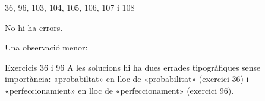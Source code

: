 
%
        {36, 96, 103, 104, 105, 106, 107 i 108}

\noindent
No hi ha errors.


\ifobs
\bigskip
\noindent
Una observació menor:\par\nopagebreak

\begin{observacio}{Exercicis 36 i 96}
  A les solucions hi ha dues errades tipogràfiques sense importància:
  «probabiltat» en lloc de «probabilitat» (exercici 36) i «perfeccionamient»
  en lloc de «perfeccionament» (exercici 96).
\end{observacio}
\fi
